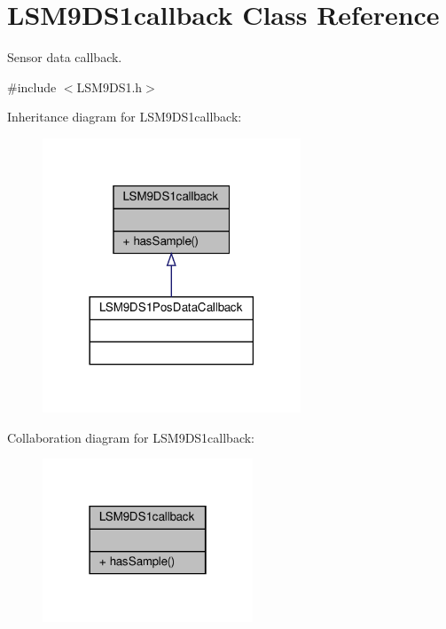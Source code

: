 \hypertarget{classLSM9DS1callback}{}\section{L\+S\+M9\+D\+S1callback Class Reference}
\label{classLSM9DS1callback}


Sensor data callback.  




{\ttfamily \#include $<$L\+S\+M9\+D\+S1.\+h$>$}



Inheritance diagram for L\+S\+M9\+D\+S1callback\+:\nopagebreak
\begin{figure}[H]
\begin{center}
\leavevmode
\includegraphics[width=218pt]{classLSM9DS1callback__inherit__graph}
\end{center}
\end{figure}


Collaboration diagram for L\+S\+M9\+D\+S1callback\+:\nopagebreak
\begin{figure}[H]
\begin{center}
\leavevmode
\includegraphics[width=178pt]{classLSM9DS1callback__coll__graph}
\end{center}
\end{figure}
